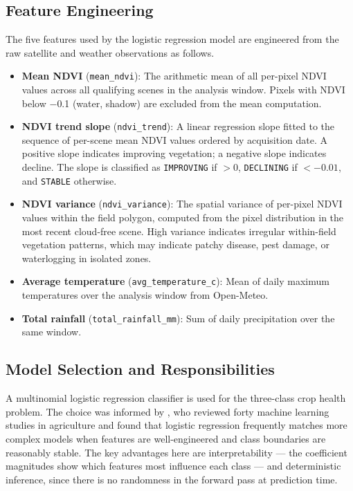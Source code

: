 \subsection{Feature Engineering}

The five features used by the logistic regression model are engineered from the raw satellite and weather observations as follows.

\begin{itemize}
  \item \textbf{Mean NDVI} (\texttt{mean\_ndvi}): The arithmetic mean of all per-pixel NDVI values across all qualifying scenes in the analysis window. Pixels with NDVI below $-$0.1 (water, shadow) are excluded from the mean computation.

  \item \textbf{NDVI trend slope} (\texttt{ndvi\_trend}): A linear regression slope fitted to the sequence of per-scene mean NDVI values ordered by acquisition date. A positive slope indicates improving vegetation; a negative slope indicates decline. The slope is classified as \texttt{IMPROVING} if $> 0$, \texttt{DECLINING} if $< -0.01$, and \texttt{STABLE} otherwise. \citep{weiss2020}

  \item \textbf{NDVI variance} (\texttt{ndvi\_variance}): The spatial variance of per-pixel NDVI values within the field polygon, computed from the pixel distribution in the most recent cloud-free scene. High variance indicates irregular within-field vegetation patterns, which may indicate patchy disease, pest damage, or waterlogging in isolated zones. \citep{nyoka2020}

  \item \textbf{Average temperature} (\texttt{avg\_temperature\_c}): Mean of daily maximum temperatures over the analysis window from Open-Meteo.

  \item \textbf{Total rainfall} (\texttt{total\_rainfall\_mm}): Sum of daily precipitation over the same window.
\end{itemize}

\subsection{Model Selection and Responsibilities}

A multinomial logistic regression classifier is used for the three-class crop health problem. The choice was informed by \citet{liakos2018}, who reviewed forty machine learning studies in agriculture and found that logistic regression frequently matches more complex models when features are well-engineered and class boundaries are reasonably stable. The key advantages here are interpretability — the coefficient magnitudes show which features most influence each class — and deterministic inference, since there is no randomness in the forward pass at prediction time.

